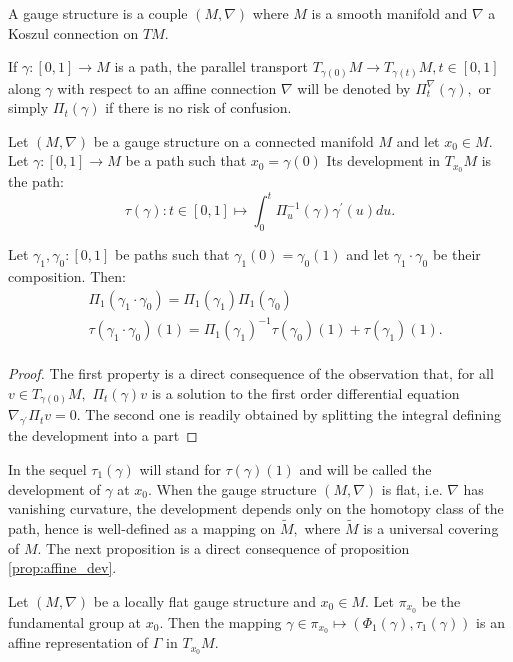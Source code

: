 \begin{defn}
\label{def:gauge_structure}
A gauge structure is a couple $\left( M, \nabla\right)$ where $M$ is a smooth manifold and $\nabla$ a Koszul connection on $TM.$
\end{defn}
\begin{nota}
If $\gamma \colon [0,1] \to M$ is a path, the parallel transport $T_{\gamma(0)}M \to T_{\gamma(t)}M, t \in [0,1]$ along $\gamma$ 
with respect to an affine connection $\nabla$
will be denoted by $\Pi^\nabla_t(\gamma),$ or simply  $\Pi_t(\gamma)$ 
if there is no risk of confusion.
\end{nota}
\begin{defn}
\label{def:developing_map}
Let $\left(M, \nabla \right)$ be a gauge structure on a connected manifold $M$ and let $x_0 \in M.$ Let
$\gamma \colon [0,1] \to M$ be a path such that $x_0 = \gamma(0)$ Its development in $T_{x_0}M$ is the path:
\begin{equation*}
    \tau(\gamma) \colon t \in [0,1] \mapsto \int_0^t \Pi^{-1}_u(\gamma) \gamma^\prime(u) du.
\end{equation*}
\end{defn}
\begin{prop}
  \label{prop:affine_dev}
Let $\gamma_1, \gamma_0 \colon [0,1]$ be paths such that $\gamma_1(0)=\gamma_0(1)$ and let $\gamma_1 \cdot \gamma_0$ be their composition. Then:
\begin{equation*}
    \begin{split}
        &\Pi_1(\gamma_1 \cdot \gamma_0) = \Pi_1(\gamma_1)\Pi_1(\gamma_0) \\
        &\tau(\gamma_1 \cdot \gamma_0)(1) = \Pi_1(\gamma_1)^{-1}\tau(\gamma_0)(1) + \tau(\gamma_1)(1). \\
    \end{split}
\end{equation*}
\end{prop}
\begin{proof}
The first property is a direct consequence of the observation that, for all $v \in T_{\gamma(0)}M,$ $\Pi_t(\gamma)v$ is a solution to the first order differential equation $\nabla_{\gamma^\prime}\Pi_t v = 0.$
The second one is readily obtained by splitting the integral defining the development into a part
\end{proof}
In the sequel $\tau_1(\gamma)$ will stand for $\tau(\gamma)(1)$ and will be called the development of 
$\gamma$ at $x_0.$
When the gauge structure $(M,\nabla)$ is flat, i.e. $\nabla$ has vanishing curvature,
 the development depends only on the homotopy class of the path, 
 hence is well-defined as a mapping on $\tilde{M},$ where $\tilde{M}$ is a universal covering of $M$.
 The next proposition is a direct consequence of proposition \ref{prop:affine_dev}.
 \begin{prop}
  \label{prop:affine_action}
 Let $(M, \nabla)$ be a locally flat gauge structure and $x_0 \in M$. Let $\pi_{x_0}$ be the fundamental group
 at $x_0$. Then the mapping $\gamma \in \pi_{x_0} \mapsto \left( \Phi_1(\gamma), \tau_1(\gamma) \right)$ 
 is an affine representation of $\Gamma$ in $T_{x_0}M.$
 \end{prop}

